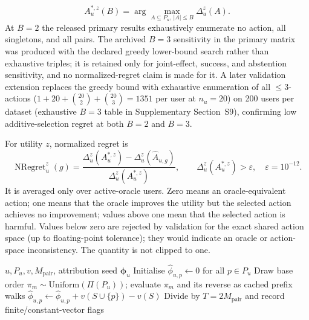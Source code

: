 \documentclass[manuscript,screen,review,anonymous]{acmart}
\begin{document}
\begin{equation}
A_u^{*,z}(B)=\arg\max_{A\subseteq P_u,\,|A|\le B}\Delta_u^z(A).
\end{equation}
At $B=2$ the released primary results exhaustively enumerate no action, all singletons, and all pairs. The archived $B=3$ sensitivity in the primary matrix was produced with the declared greedy lower-bound search rather than exhaustive triples; it is retained only for joint-effect, success, and abstention sensitivity, and no normalized-regret claim is made for it. A later validation extension replaces the greedy bound with exhaustive enumeration of all $\le3$-actions ($1+20+\binom{20}{2}+\binom{20}{3}=1351$ per user at $n_u=20$) on 200 users per dataset (exhaustive $B=3$ table in Supplementary Section~S9), confirming low additive-selection regret at both $B=2$ and $B=3$.

For utility $z$, normalized regret is
\begin{equation}
\operatorname{NRegret}_u^z(g)=
\frac{\Delta_u^z(A_u^{*,z})-\Delta_u^z(\widehat A_{u,g})}
{\Delta_u^z(A_u^{*,z})},
\qquad \Delta_u^z(A_u^{*,z})>\varepsilon,
\quad \varepsilon=10^{-12}.
\label{eq:nregret}
\end{equation}
It is averaged only over active-oracle users. Zero means an oracle-equivalent action; one means that the oracle improves the utility but the selected action achieves no improvement; values above one mean that the selected action is harmful. Values below zero are rejected by validation for the exact shared action space (up to floating-point tolerance); they would indicate an oracle or action-space inconsistency. The quantity is not clipped to one.

\begin{algorithm}[t]
\caption{Paired Monte Carlo attribution}
\label{alg:shapley}
\begin{algorithmic}[1]
\Require $u,P_u,v,M_{\mathrm{pair}}$, attribution seed
\Ensure $\widehat{\boldsymbol\phi}_u$
\State Initialise $\hat\phi_{u,p}\gets0$ for all $p\in P_u$
\State Draw base order $\pi_m\sim\mathrm{Uniform}(\Pi(P_u))$; evaluate $\pi_m$ and its reverse as cached prefix walks
\State $\hat\phi_{u,p}\gets\hat\phi_{u,p}+v(S\cup\{p\})-v(S)$
\EndFor
\EndFor
\State Divide by $T=2M_{\mathrm{pair}}$ and record finite/constant-vector flags
\end{algorithmic}
\end{algorithm}
\end{document}
